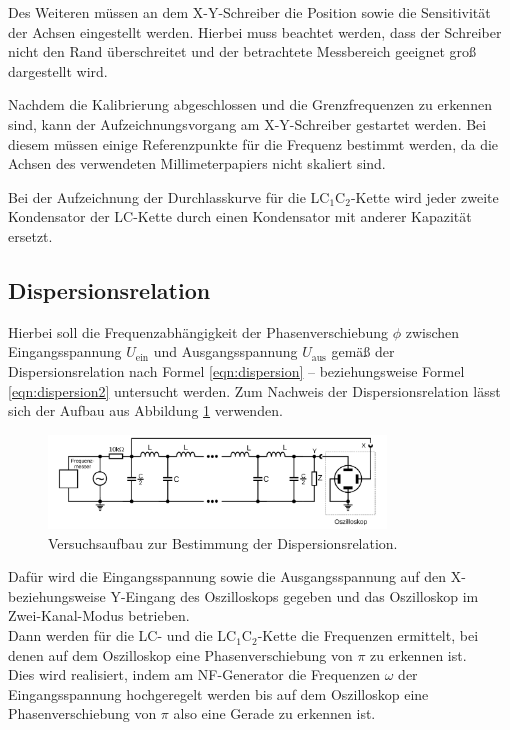 Des Weiteren müssen an dem X-Y-Schreiber die Position sowie die Sensitivität der Achsen eingestellt werden.
Hierbei muss beachtet werden, dass der Schreiber nicht den Rand überschreitet und der betrachtete Messbereich geeignet groß dargestellt wird.

Nachdem die Kalibrierung abgeschlossen und die Grenzfrequenzen zu erkennen sind, kann der Aufzeichnungsvorgang am X-Y-Schreiber gestartet werden.
Bei diesem müssen einige Referenzpunkte für die Frequenz bestimmt werden,
da die Achsen des verwendeten Millimeterpapiers nicht skaliert sind.

Bei der Aufzeichnung der Durchlasskurve für die LC$_1$C$_2$-Kette wird jeder zweite Kondensator der LC-Kette durch einen Kondensator mit anderer Kapazität ersetzt.


\subsection{Dispersionsrelation}
\label{sec:dispi}

Hierbei soll die Frequenzabhängigkeit der Phasenverschiebung $\phi$
zwischen Eingangsspannung $U_{\text{ein}}$ und Ausgangsspannung $U_{\text{aus}}$ gemäß der Dispersionsrelation nach Formel \eqref{eqn:dispersion}
-- beziehungsweise Formel \eqref{eqn:dispersion2} untersucht werden.
Zum Nachweis der Dispersionsrelation lässt sich der Aufbau aus Abbildung
\ref{fig:dispersionsrealtion} verwenden.
\begin{figure}
	\centering
	\includegraphics[width=0.8\textwidth]{Bilder/dispersionsrelation.png}
	\caption{Versuchsaufbau zur Bestimmung der Dispersionsrelation. \cite{Anleitung}}
	\label{fig:dispersionsrealtion}
\end{figure}
Dafür wird die Eingangsspannung sowie die Ausgangsspannung auf den X- beziehungsweise Y-Eingang
des Oszilloskops gegeben und das Oszilloskop im Zwei-Kanal-Modus betrieben.\\
Dann werden für die LC- und die LC$_1$C$_2$-Kette die Frequenzen ermittelt, bei denen auf
dem Oszilloskop eine Phasenverschiebung von $\pi$ zu erkennen ist.\\
Dies wird realisiert, indem am NF-Generator die Frequenzen $\omega$ der Eingangsspannung
hochgeregelt werden bis auf dem Oszilloskop eine Phasenverschiebung von $\pi$ also eine
Gerade zu erkennen ist.


